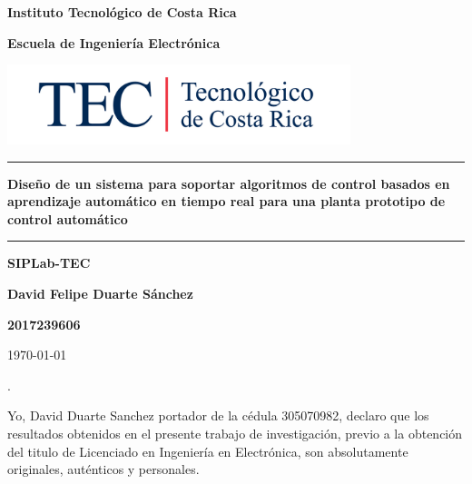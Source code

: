 \documentclass[12pt]{article}
\begin{document}
\begin{titlepage}

\centering


\vspace{10cm}

\textbf{\LARGE Instituto Tecnológico de Costa Rica}

\vspace{2cm}

\textbf{\LARGE Escuela de Ingeniería Electrónica}

\vspace{2cm}

\includegraphics[width=10cm]{logotec/image.png}
\vspace{2cm}

\hrule

\vspace{1cm}

\textbf{\LARGE Diseño de un sistema para soportar algoritmos de control basados en aprendizaje automático en tiempo real para una planta prototipo de control automático}

\vspace{1cm}

\hrule

\vspace{1cm}

\textbf{\LARGE SIPLab-TEC}

\vspace{1cm}

\textbf{\LARGE David Felipe Duarte Sánchez}

\vspace{1cm}

\textbf{\LARGE 2017239606}

\vspace{1cm}

\today %

\end{titlepage}
.
\par
\vspace{16cm} %

Yo, David Duarte Sanchez portador de la cédula 305070982, declaro que los resultados obtenidos en el presente trabajo de investigación, previo a la obtención del titulo de Licenciado en Ingeniería en Electrónica, son absolutamente originales, auténticos y personales.
\end{document}
